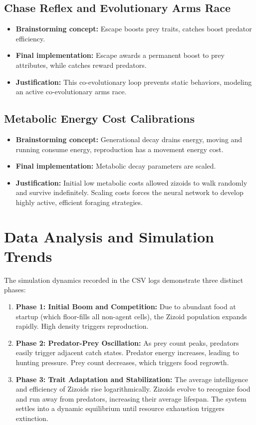 \documentclass[11pt,a4paper]{article}
\begin{document}
\subsection{Chase Reflex and Evolutionary Arms Race}
\begin{itemize}
    \item \textbf{Brainstorming concept:} Escape boosts prey traits, catches boost predator efficiency.
    \item \textbf{Final implementation:} Escape awards a permanent boost to prey attributes, while catches reward predators.
    \item \textbf{Justification:} This co-evolutionary loop prevents static behaviors, modeling an active co-evolutionary arms race.
\end{itemize}

\subsection{Metabolic Energy Cost Calibrations}
\begin{itemize}
    \item \textbf{Brainstorming concept:} Generational decay drains energy, moving and running consume energy, reproduction has a movement energy cost.
    \item \textbf{Final implementation:} Metabolic decay parameters are scaled.
    \item \textbf{Justification:} Initial low metabolic costs allowed zizoids to walk randomly and survive indefinitely. Scaling costs forces the neural network to develop highly active, efficient foraging strategies.
\end{itemize}

\section{Data Analysis and Simulation Trends}

The simulation dynamics recorded in the CSV logs demonstrate three distinct phases:
\begin{enumerate}
    \item \textbf{Phase 1: Initial Boom and Competition:} Due to abundant food at startup (which floor-fills all non-agent cells), the Zizoid population expands rapidly. High density triggers reproduction.
    \item \textbf{Phase 2: Predator-Prey Oscillation:} As prey count peaks, predators easily trigger adjacent catch states. Predator energy increases, leading to hunting pressure. Prey count decreases, which triggers food regrowth.
    \item \textbf{Phase 3: Trait Adaptation and Stabilization:} The average intelligence and efficiency of Zizoids rise logarithmically. Zizoids evolve to recognize food and run away from predators, increasing their average lifespan. The system settles into a dynamic equilibrium until resource exhaustion triggers extinction.
\end{enumerate}
\end{document}
